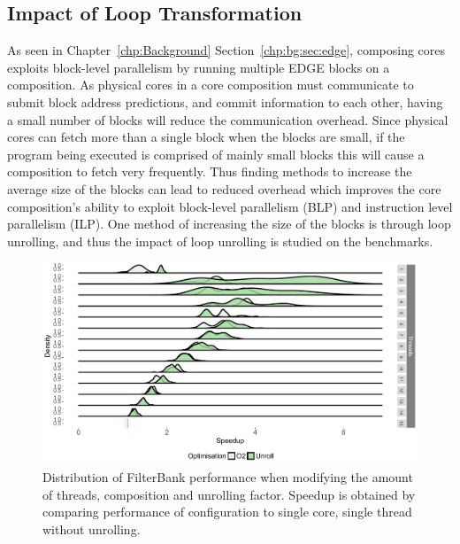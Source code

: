 \subsection{Impact of Loop Transformation}
As seen in Chapter~\ref{chp:Background} Section~\ref{chp:bg:sec:edge}, composing cores exploits block-level parallelism by running multiple EDGE blocks on a composition.
As physical cores in a core composition must communicate to submit block address predictions, and commit information to each other, having a small number of blocks will reduce the communication overhead.
Since physical cores can fetch more than a single block when the blocks are small, if the program being executed is comprised of mainly small blocks this will cause a composition to fetch very frequently.
Thus finding methods to increase the average size of the blocks can lead to reduced overhead which improves the core composition's ability to exploit block-level parallelism (BLP) and instruction level parallelism (ILP).
One method of increasing the size of the blocks is through loop unrolling, and thus the impact of loop unrolling is studied on the benchmarks.

\begin{figure}[t]
  \includegraphics[width=1\textwidth]{streamit-paper/graphics/filterbank_unroll2.pdf}
  \vspace{-1em}
  \caption{Distribution of FilterBank performance when modifying the amount of threads, composition and unrolling factor. Speedup is obtained by comparing performance of configuration to single core, single thread without unrolling.}\label{fig:fbunroll}  \vspace{-1em}

\end{figure}

